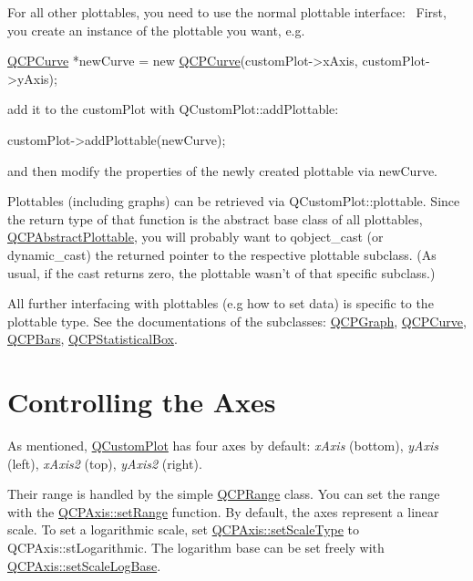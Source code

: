 For all other plottables, you need to use the normal plottable interface\+:~\newline
First, you create an instance of the plottable you want, e.\+g. 
\begin{DoxyCode}
\hyperlink{a00028}{QCPCurve} *newCurve = \textcolor{keyword}{new} \hyperlink{a00028}{QCPCurve}(customPlot->xAxis, customPlot->yAxis);
\end{DoxyCode}
 add it to the custom\+Plot with Q\+Custom\+Plot\+::add\+Plottable\+: 
\begin{DoxyCode}
customPlot->addPlottable(newCurve);
\end{DoxyCode}
 and then modify the properties of the newly created plottable via {\ttfamily new\+Curve}.

Plottables (including graphs) can be retrieved via Q\+Custom\+Plot\+::plottable. Since the return type of that function is the abstract base class of all plottables, \hyperlink{a00024}{Q\+C\+P\+Abstract\+Plottable}, you will probably want to qobject\+\_\+cast (or dynamic\+\_\+cast) the returned pointer to the respective plottable subclass. (As usual, if the cast returns zero, the plottable wasn't of that specific subclass.)

All further interfacing with plottables (e.\+g how to set data) is specific to the plottable type. See the documentations of the subclasses\+: \hyperlink{a00031}{Q\+C\+P\+Graph}, \hyperlink{a00028}{Q\+C\+P\+Curve}, \hyperlink{a00027}{Q\+C\+P\+Bars}, \hyperlink{a00050}{Q\+C\+P\+Statistical\+Box}.\hypertarget{index_axes}{}\section{Controlling the Axes}\label{index_axes}
As mentioned, \hyperlink{a00030_d8/d00/a00186}{Q\+Custom\+Plot} has four axes by default\+: {\itshape x\+Axis} (bottom), {\itshape y\+Axis} (left), {\itshape x\+Axis2} (top), {\itshape y\+Axis2} (right).

Their range is handled by the simple \hyperlink{a00049}{Q\+C\+P\+Range} class. You can set the range with the \hyperlink{a00025_a57d6ee9e9009fe88cb19db476ec70bca}{Q\+C\+P\+Axis\+::set\+Range} function. By default, the axes represent a linear scale. To set a logarithmic scale, set \hyperlink{a00025_adb6c5c45bdf899ea221881dd3b43b406}{Q\+C\+P\+Axis\+::set\+Scale\+Type} to Q\+C\+P\+Axis\+::st\+Logarithmic. The logarithm base can be set freely with \hyperlink{a00025_a726186054be90487885a748aa1b42188}{Q\+C\+P\+Axis\+::set\+Scale\+Log\+Base}.

